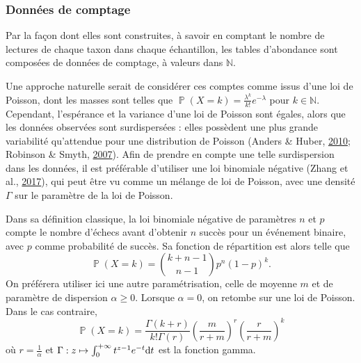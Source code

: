 \documentclass[12pt,a4paper]{reedthesis}
\newcommand \NN {\mathbb{N}}
\newcommand \dx [2] [] {\mathrm{d}^{#1}\mspace{-1mu}\mathord{#2}}
\DeclareMathOperator*{\prob}{\mathbb{P}}
\newcommand \PP [1]{\prob\left({#1}\right)}
\theoremstyle{definition}
\theoremstyle{definition}
\theoremstyle{definition}
\theoremstyle{remark}
\begin{document}
\hypertarget{donnuxe9es-de-comptage}{%
\subsubsection*{Données de comptage}\label{donnuxe9es-de-comptage}}

Par la façon dont elles sont construites, à savoir en comptant le nombre de lectures de chaque taxon dans chaque échantillon, les tables d'abondance sont composées de données de comptage, à valeurs dans \(\NN\).

Une approche naturelle serait de considérer ces comptes comme issus d'une loi de Poisson, dont les masses sont telles que \(\PP{X = k} = \frac{\lambda^k}{k!}e^{-\lambda}\) pour \(k \in \NN\). Cependant, l'espérance et la variance d'une loi de Poisson sont égales, alors que les données observées sont surdispersées : elles possèdent une plus grande variabilité qu'attendue pour une distribution de Poisson (Anders \& Huber, \protect\hyperlink{ref-anders2010differential}{2010}; Robinson \& Smyth, \protect\hyperlink{ref-robinson2007moderated}{2007}). Afin de prendre en compte une telle surdispersion dans les données, il est préférable d'utiliser une loi binomiale négative (Zhang et al., \protect\hyperlink{ref-zhang2017negative}{2017}), qui peut être vu comme un mélange de loi de Poisson, avec une densité \(\Gamma\) sur le paramètre de la loi de Poisson.

Dans sa définition classique, la loi binomiale négative de paramètres \(n\) et \(p\) compte le nombre d'échecs avant d'obtenir \(n\) succès pour un événement binaire, avec \(p\) comme probabilité de succès. Sa fonction de répartition est alors telle que
\begin{equation*}
\PP{X = k} = \binom{k+n-1}{n-1} p^n(1-p)^k.
\end{equation*}
On préférera utiliser ici une autre paramétrisation, celle de moyenne \(m\) et de paramètre de dispersion \(\alpha \geq 0\). Lorsque \(\alpha = 0\), on retombe sur une loi de Poisson. Dans le cas contraire,
\begin{equation*}
\PP{X = k} = \frac{\Gamma(k+r)}{k!\Gamma(r)}\left(\frac{m}{r+m}\right)^r\left(\frac{r}{r+m}\right)^k
\end{equation*}
où \(r=\frac{1}{\alpha}\) et \(\Gamma : z \mapsto \int_0^{+\infty}t^{z-1}e^{-t}\dx{t}\) est la fonction gamma.
\end{document}
